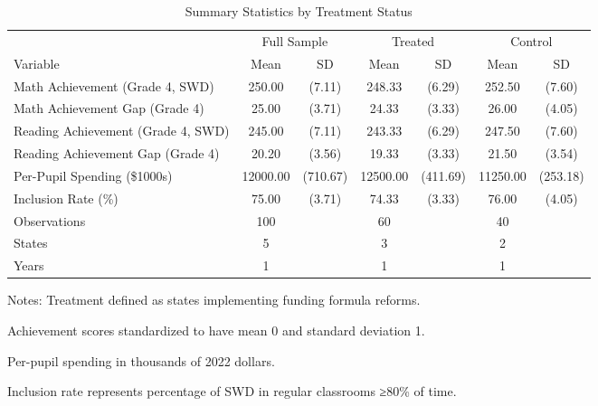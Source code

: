 \begin{table}[htbp]
\centering
\caption{Summary Statistics by Treatment Status}
\label{tab:summary_statistics}
\begin{tabular}{lcccccc}
\toprule
 & \multicolumn{2}{c}{Full Sample} & \multicolumn{2}{c}{Treated} & \multicolumn{2}{c}{Control} \\
\cmidrule(lr){2-3} \cmidrule(lr){4-5} \cmidrule(lr){6-7}
Variable & Mean & SD & Mean & SD & Mean & SD \\
\midrule
Math Achievement (Grade 4, SWD) & 250.00 & (7.11) & 248.33 & (6.29) & 252.50 & (7.60) \\
Math Achievement Gap (Grade 4) & 25.00 & (3.71) & 24.33 & (3.33) & 26.00 & (4.05) \\
Reading Achievement (Grade 4, SWD) & 245.00 & (7.11) & 243.33 & (6.29) & 247.50 & (7.60) \\
Reading Achievement Gap (Grade 4) & 20.20 & (3.56) & 19.33 & (3.33) & 21.50 & (3.54) \\
Per-Pupil Spending (\$1000s) & 12000.00 & (710.67) & 12500.00 & (411.69) & 11250.00 & (253.18) \\
Inclusion Rate (\%) & 75.00 & (3.71) & 74.33 & (3.33) & 76.00 & (4.05) \\
\midrule
Observations & 100 & & 60 & & 40 & \\
States & 5 & & 3 & & 2 & \\
Years & 1 & & 1 & & 1 & \\
\bottomrule
\end{tabular}
\begin{tablenotes}
\small
\item Notes: Treatment defined as states implementing funding formula reforms.
\item Achievement scores standardized to have mean 0 and standard deviation 1.
\item Per-pupil spending in thousands of 2022 dollars.
\item Inclusion rate represents percentage of SWD in regular classrooms ≥80\% of time.
\end{tablenotes}
\end{table}